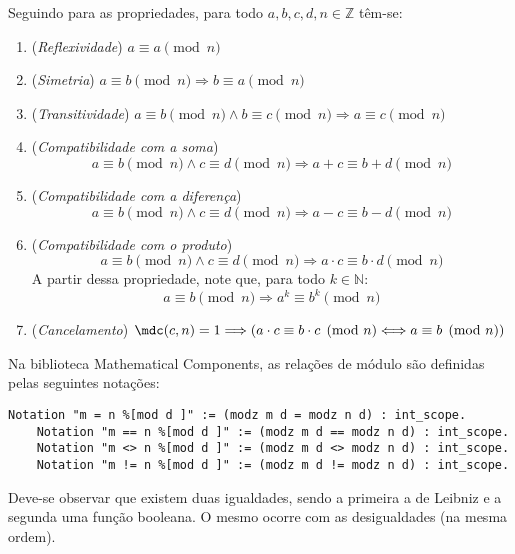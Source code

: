     Seguindo para as propriedades, para todo $a,b, c, d, n \in \mathbb{Z}$ têm-se:
\begin{enumerate}
    \item (\textit{Reflexividade}) $a \equiv a \pmod{n}$
    \item (\textit{Simetria}) $a \equiv b \pmod{n} \Longrightarrow b \equiv a \pmod{n}$
    \item (\textit{Transitividade}) $a \equiv b \pmod{n} \land b \equiv c \pmod{n} \Longrightarrow a \equiv c \pmod{n}$
    \item (\textit{Compatibilidade com a soma})
    \begin{equation*}
        a \equiv b \pmod{n} \land c \equiv d \pmod{n} \Longrightarrow a + c \equiv b + d \pmod{n}
    \end{equation*}
    \item (\textit{Compatibilidade com a diferença})
    \begin{equation*}
        a \equiv b \pmod{n} \land c \equiv d \pmod{n} \Longrightarrow a - c \equiv b - d \pmod{n}
    \end{equation*}
    \item \label{item:propcong6-produto} (\textit{Compatibilidade com o produto})
    \begin{equation*}
        a \equiv b \pmod{n} \land c \equiv d \pmod{n} \Longrightarrow a \cdot c \equiv b \cdot d \pmod{n}
    \end{equation*}
    A partir dessa propriedade, note que, para todo $k \in \mathbb{N}$:
    \begin{equation*}
        a \equiv b \pmod{n} \Longrightarrow a^k \equiv b^k \pmod{n}
    \end{equation*}
    \item \label{item:propcong7-cancelamento} (\textit{Cancelamento}) $\mdc(c, n) = 1 \Longrightarrow (a \cdot c \equiv b \cdot c \pmod{n} \Longleftrightarrow a \equiv b \pmod{n})$   
\end{enumerate}

Na biblioteca Mathematical Components, as relações de módulo são definidas pelas seguintes notações:
\begin{lstlisting}[language = coq]
    Notation "m = n %[mod d ]" := (modz m d = modz n d) : int_scope.
    Notation "m == n %[mod d ]" := (modz m d == modz n d) : int_scope.
    Notation "m <> n %[mod d ]" := (modz m d <> modz n d) : int_scope.
    Notation "m != n %[mod d ]" := (modz m d != modz n d) : int_scope.
\end{lstlisting}
Deve-se observar que existem duas igualdades, sendo a primeira a de Leibniz e a segunda uma função booleana. O mesmo ocorre com as desigualdades (na mesma ordem).

